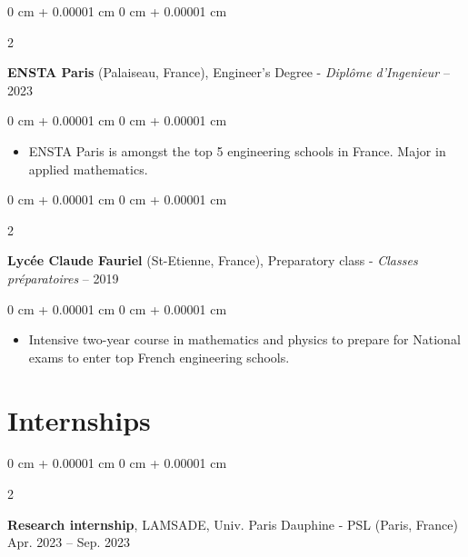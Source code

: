 \documentclass[10pt, letterpaper]{article}
\newenvironment{highlights}{
    \begin{itemize}[
        topsep=0.10 cm,
        parsep=0.10 cm,
        partopsep=0pt,
        itemsep=0pt,
        leftmargin=0 cm + 10pt
    ]
}{
    \end{itemize}
} %
\newenvironment{onecolentry}{
    \begin{adjustwidth}{
        0 cm + 0.00001 cm
    }{
        0 cm + 0.00001 cm
    }
}{
    \end{adjustwidth}
} %
\newenvironment{twocolentry}[2][]{
    \onecolentry
    \def\secondColumn{#2}
    \setcolumnwidth{\fill, 4.5 cm}
    \begin{paracol}{2}
}{
    \switchcolumn \raggedleft \secondColumn
    \end{paracol}
    \endonecolentry
} %
\begin{document}
        \begin{twocolentry}{
            2019 – 2023
        }
            \textbf{ENSTA Paris} (Palaiseau, France), Engineer's Degree - \textit {Diplôme d'Ingenieur}\end{twocolentry}
        \vspace{0.10 cm}
        \begin{onecolentry}
            \begin{highlights}
                \item ENSTA Paris is amongst the top 5 engineering schools in France. Major in applied mathematics.
            \end{highlights}
        \end{onecolentry}

        \vspace{0.2 cm}

        \begin{twocolentry}{
            2017 – 2019
        }
            \textbf{Lycée Claude Fauriel} (St-Etienne, France), Preparatory class - \textit{Classes préparatoires}\end{twocolentry}
        \vspace{0.10 cm}
        \begin{onecolentry}
            \begin{highlights}
                \item Intensive two-year course in mathematics and physics to prepare for National exams to enter top French engineering schools.
            \end{highlights}
        \end{onecolentry}




    
    \section{Internships}

        
        \begin{twocolentry}{
            Apr. 2023 – Sep. 2023
        }
            \textbf{Research internship}, LAMSADE, Univ. Paris Dauphine - PSL (Paris, France)\end{twocolentry}
\end{document}

